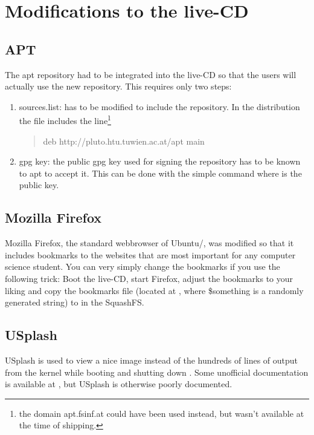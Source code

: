 
\chapter{Modifications to the live-CD}\label{chapter:modifications}

\section{APT}
The \tunix apt repository had to be integrated into the \tunix live-CD so that
the users will actually use the new repository. This requires only two steps:
\begin{enumerate}
  \item sources.list:  has to be modified to include
    the repository. In the \tunix distribution the file includes the
    line\footnote{the domain apt.fsinf.at could have been used instead, but
    wasn't available at the time of shipping.}
    \begin{quote}deb http://pluto.htu.tuwien.ac.at/apt main\end{quote}
  \item gpg key: the public gpg key used for signing the repository has to be
    known to apt to accept it. This can be done with the simple command
     where  is the public key.
\end{enumerate}

\section{Mozilla Firefox}
Mozilla Firefox, the standard webbrowser of Ubuntu/\tunix, was modified so that
it includes bookmarks to the websites that are most important for any computer
science student. You can very simply change the bookmarks if you use the
following trick: Boot the live-CD, start Firefox, adjust the bookmarks to your
liking and copy the bookmarks file (located at
, where
\$something is a randomly generated string) to  in
the SquashFS.

\section{USplash}
USplash is used to view a nice image instead of the hundreds of lines of output
from the kernel while booting and shutting down \tunix. Some unofficial
documentation is available at \cite{USplashCustomizationHowto}, but USplash is
otherwise poorly documented. 

